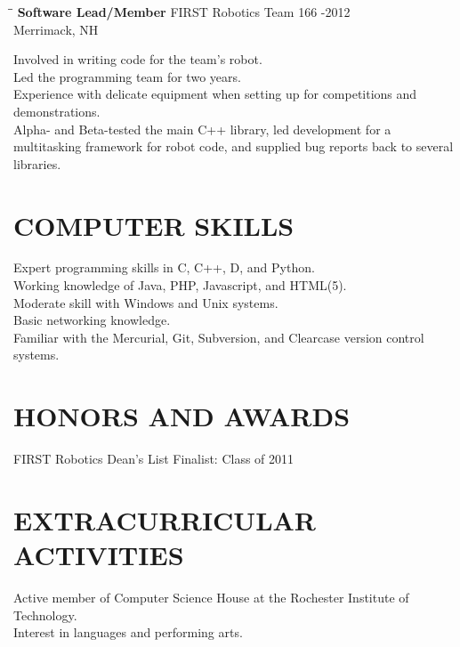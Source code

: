 \documentclass{res}
\begin{document}
\begin{resume}
   \begin{tabbing}
   \hspace{2.3in}\= \hspace{2.6in}\= \kill %
    {\bf Software Lead/Member} \>FIRST Robotics Team 166     -2012\\
                               \>Merrimack, NH
   \end{tabbing}\vspace{-20pt}      %
    Involved in writing code for the team's robot.\\
    Led the programming team for two years.\\
    Experience with delicate equipment when setting up for competitions and demonstrations.\\
    Alpha- and Beta-tested the main C++ library,
    led development for a multitasking framework for robot code,
    and supplied bug reports back to several libraries.


\section{COMPUTER SKILLS}
    Expert programming skills in C, C++, D, and Python.\\
    Working knowledge of Java, PHP, Javascript, and HTML(5).\\
    Moderate skill with Windows and Unix systems.\\
    Basic networking knowledge.\\
    Familiar with the Mercurial, Git, Subversion, and Clearcase version control systems.


\section{HONORS AND AWARDS}
    FIRST Robotics Dean's List Finalist: Class of 2011

\section{EXTRACURRICULAR ACTIVITIES}
    Active member of Computer Science House at the Rochester Institute of Technology.\\
    Interest in languages and performing arts.

\end{resume}
\end{document}
